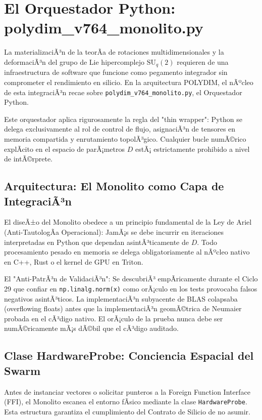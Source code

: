 ﻿\chapter{El Orquestador Python: polydim\_v764\_monolito.py}
\label{cap:orquestador_python}

La materializaciÃ³n de la teorÃ­a de rotaciones multidimensionales y la deformaciÃ³n del grupo de Lie hipercomplejo \(\text{SU}_q(2)\) requieren de una infraestructura de software que funcione como pegamento integrador sin comprometer el rendimiento en silicio. En la arquitectura POLYDIM, el nÃºcleo de esta integraciÃ³n recae sobre \texttt{polydim\_v764\_monolito.py}, el Orquestador Python.

Este orquestador aplica rigurosamente la regla del "thin wrapper": Python se delega exclusivamente al rol de control de flujo, asignaciÃ³n de tensores en memoria compartida y enrutamiento topolÃ³gico. Cualquier bucle numÃ©rico explÃ­cito en el espacio de parÃ¡metros \(D\) estÃ¡ estrictamente prohibido a nivel de intÃ©rprete.

\section{Arquitectura: El Monolito como Capa de IntegraciÃ³n}
\label{sec:architecture_monolith}

El diseÃ±o del Monolito obedece a un principio fundamental de la Ley de Ariel (Anti-TautologÃ­a Operacional): JamÃ¡s se debe incurrir en iteraciones interpretadas en Python que dependan asintÃ³ticamente de \(D\). Todo procesamiento pesado en memoria se delega obligatoriamente al nÃºcleo nativo en C++, Rust o el kernel de GPU en Triton.

El "Anti-PatrÃ³n de ValidaciÃ³n": Se descubriÃ³ empÃ­ricamente durante el Ciclo 29 que confiar en \texttt{np.linalg.norm(x)} como orÃ¡culo en los tests provocaba falsos negativos asintÃ³ticos. La implementaciÃ³n subyacente de BLAS colapsaba (overflowing floats) antes que la implementaciÃ³n geomÃ©trica de Neumaier probada en el cÃ³digo nativo. El orÃ¡culo de la prueba nunca debe ser numÃ©ricamente mÃ¡s dÃ©bil que el cÃ³digo auditado.

\section{Clase HardwareProbe: Conciencia Espacial del Swarm}
\label{sec:hardware_probe}

Antes de instanciar vectores o solicitar punteros a la Foreign Function Interface (FFI), el Monolito escanea el entorno fÃ­sico mediante la clase \texttt{HardwareProbe}. Esta estructura garantiza el cumplimiento del Contrato de Silicio de no asumir.

